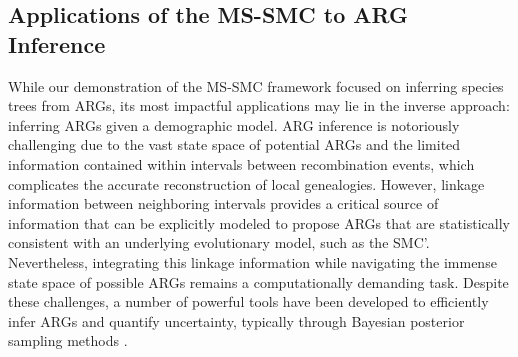 \documentclass[11pt]{article}
\begin{document}


\subsection{Applications of the MS-SMC to ARG Inference}
While our demonstration of the MS-SMC framework focused on inferring
species trees from ARGs, its most impactful applications may lie 
in the inverse approach: inferring ARGs given a demographic model.
ARG inference is notoriously challenging due to the vast state
space of potential ARGs and the limited information contained
within intervals between recombination events, which complicates
the accurate reconstruction of local genealogies.
However, linkage information between neighboring intervals provides
a critical source of information that can be explicitly
modeled to propose ARGs that are statistically consistent with
an underlying evolutionary model, such as the SMC'.
% 
Nevertheless, integrating this linkage information while navigating
the immense state space of possible ARGs remains a computationally
demanding task. 
Despite these challenges, 
a number of powerful tools have been developed to efficiently 
infer ARGs and quantify uncertainty, typically through Bayesian 
posterior sampling methods
\citep{y_c_brandt_evaluation_2022,lewanski_era_2024}.
\end{document}
